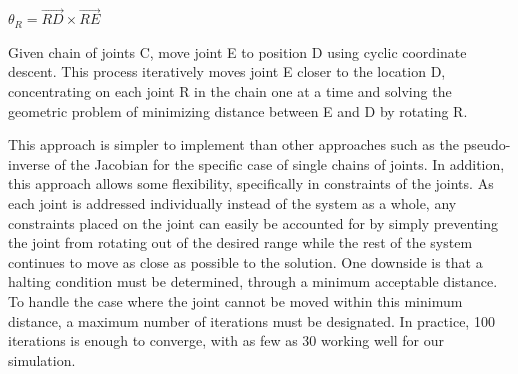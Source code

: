 \begin{algorithm}[ht]
	\centering
	\begin{algorithmic}[H]
		\Repeat
			\State $\theta_R = \vec{RD} \times \vec{RE}$
		\EndFor
		\EndFunction
	\end{algorithmic}
	\caption[Single chain IK algorithm]{Given chain of joints C, move joint E to position D using cyclic coordinate descent.  This process iteratively moves joint E closer to the location D, concentrating on each joint R in the chain one at a time and solving the geometric problem of minimizing distance between E and D by rotating R.}
	\label{alg:ik}
\end{algorithm}

This approach is simpler to implement than other approaches such as the pseudo-inverse of the Jacobian for the specific case of single chains of joints.  In addition, this approach allows some flexibility, specifically in constraints of the joints.  As each joint is addressed individually instead of the system as a whole, any constraints placed on the joint can easily be accounted for by simply preventing the joint from rotating out of the desired range while the rest of the system continues to move as close as possible to the solution.  One downside is that a halting condition must be determined, through a minimum acceptable distance.  To handle the case where the joint cannot be moved within this minimum distance, a maximum number of iterations must be designated.  In practice, 100 iterations is enough to converge, with as few as 30 working well for our simulation.

